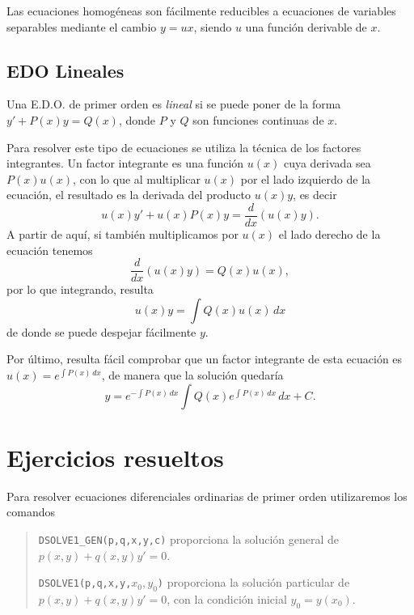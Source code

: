 Las ecuaciones homogéneas son fácilmente reducibles a ecuaciones de variables separables mediante el cambio $y=ux$,
siendo $u$ una función derivable de $x$.

\subsection{EDO Lineales}
Una E.D.O. de primer orden es \emph{lineal} si se puede poner de la forma $y'+ P(x)y = Q(x)$, donde $P$ y $Q$ son
funciones continuas de $x$.

Para resolver este tipo de ecuaciones se utiliza la técnica de los factores integrantes. 
Un factor integrante es una función $u(x)$ cuya derivada sea $P(x)u(x)$, con lo que al multiplicar $u(x)$ por el lado
izquierdo de la ecuación, el resultado es la derivada del producto $u(x)y$, es decir
\[
u(x)y'+u(x)P(x)y=\frac{d}{dx}(u(x)y).
\]
A partir de aquí, si también multiplicamos por $u(x)$ el lado derecho de la ecuación tenemos
\[
\frac{d}{dx}(u(x)y)=Q(x)u(x),
\]
por lo que integrando, resulta
\[
u(x)y=\int Q(x)u(x)\,dx
\]
de donde se puede despejar fácilmente $y$.

Por último, resulta fácil comprobar que un factor integrante de esta ecuación es $u(x)=e^{\int P(x)\, dx}$, de manera
que la solución quedaría
\[
y=e^{-\int P(x)\,dx}\int Q(x)e^{\int P(x)\,dx}\,dx+C.
\]

\newpage

\section{Ejercicios resueltos}

\begin{indicacion}
{ Para resolver ecuaciones diferenciales ordinarias de primer orden utilizaremos los comandos
\begin{quote}
\texttt{DSOLVE1\_GEN(p,q,x,y,c)} proporciona la solución general de $p(x,y)+q(x,y)y'=0$.

\texttt{DSOLVE1(p,q,x,y,$x_{0},y_{0}$)} proporciona la solución particular de $p(x,y)+q(x,y)y'=0$, con la condición inicial $y_{0}=y(x_{0})$.
\end{quote}
}
\end{indicacion}

